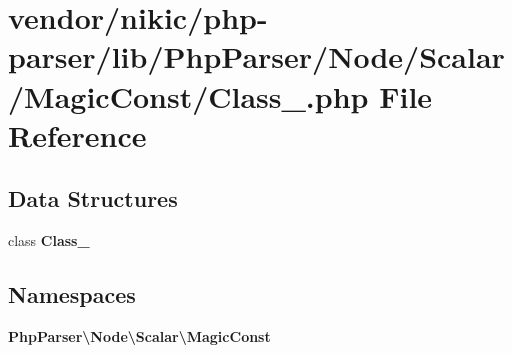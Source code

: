 \section{vendor/nikic/php-\/parser/lib/\+Php\+Parser/\+Node/\+Scalar/\+Magic\+Const/\+Class\+\_\+.php File Reference}
\label{_node_2_scalar_2_magic_const_2_class___8php}
\subsection*{Data Structures}
\begin{DoxyCompactItemize}
\item 
class {\bf Class\+\_\+}
\end{DoxyCompactItemize}
\subsection*{Namespaces}
\begin{DoxyCompactItemize}
\item 
 {\bf Php\+Parser\textbackslash{}\+Node\textbackslash{}\+Scalar\textbackslash{}\+Magic\+Const}
\end{DoxyCompactItemize}
